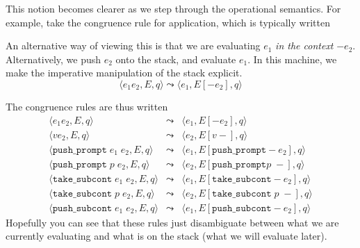 This notion becomes clearer as we step through the operational semantics. For example, take the congruence rule for application, which is typically written
\begin{center}
\end{center}
An alternative way of viewing this is that we are evaluating $e_1$ \textit{in the context} $- e_2$. Alternatively, we push $e_2$ onto the stack, and evaluate $e_1$. In this machine, we make the imperative manipulation of the stack explicit. 
\[\langle e_1 e_2, E, q \rangle \leadsto \langle e_1, E[- e_2], q \rangle\]

The congruence rules are thus written
\[\begin{array}{lcl}
    \langle e_1 e_2, E, q \rangle & \leadsto & \langle e_1, E[- e_2], q \rangle \\
    \langle v e_2, E, q \rangle & \leadsto & \langle e_2, E[v -], q \rangle \\ 
    \langle \texttt{push\_prompt} \; e_1 \; e_2, E, q \rangle & \leadsto & \langle e_1, E[\texttt{push\_prompt} - e_2], q \rangle \\ 
    \langle \texttt{push\_prompt} \; p \; e_2, E, q \rangle & \leadsto & \langle e_2, E[\texttt{push\_prompt} p \; -], q \rangle \\ 
    \langle \texttt{take\_subcont} \; e_1 \; e_2, E, q \rangle & \leadsto & \langle e_1, E[\texttt{take\_subcont} - e_2], q \rangle \\ 
    \langle \texttt{take\_subcont} \; p \; e_2, E, q \rangle & \leadsto & \langle e_2, E[\texttt{take\_subcont} \; p \; -], q \rangle \\ 
    \langle \texttt{push\_subcont} \; e_1 \; e_2, E, q \rangle & \leadsto & \langle e_1, E[\texttt{push\_subcont} - e_2], q \rangle 
\end{array}\]
Hopefully you can see that these rules just disambiguate between what we are currently evaluating and what is on the stack (what we will evaluate later).

